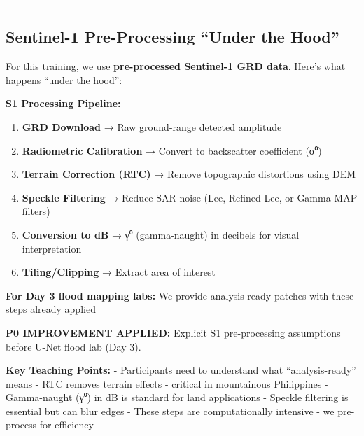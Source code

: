 \documentclass[
  letterpaper,
  DIV=11,
  numbers=noendperiod]{scrartcl}
\providecommand{\tightlist}{%
  \setlength{\itemsep}{0pt}\setlength{\parskip}{0pt}}
\begin{document}
\begin{center}\rule{0.5\linewidth}{0.5pt}\end{center}

\subsection{Sentinel-1 Pre-Processing ``Under the
Hood''}\label{sentinel-1-pre-processing-under-the-hood}

\begin{tcolorbox}[enhanced jigsaw, left=2mm, opacityback=0, toprule=.15mm, breakable, title=\textcolor{quarto-callout-note-color}{\faInfo}\hspace{0.5em}{What Happens Before You See SAR Data?}, colbacktitle=quarto-callout-note-color!10!white, arc=.35mm, titlerule=0mm, colback=white, bottomtitle=1mm, colframe=quarto-callout-note-color-frame, leftrule=.75mm, toptitle=1mm, rightrule=.15mm, bottomrule=.15mm, opacitybacktitle=0.6, coltitle=black]

For this training, we use \textbf{pre-processed Sentinel-1 GRD data}.
Here's what happens ``under the hood'':

\end{tcolorbox}

\textbf{S1 Processing Pipeline:}

\begin{enumerate}
\def\labelenumi{\arabic{enumi}.}
\tightlist
\item
  \textbf{GRD Download} → Raw ground-range detected amplitude
\item
  \textbf{Radiometric Calibration} → Convert to backscatter coefficient
  (σ⁰)
\item
  \textbf{Terrain Correction (RTC)} → Remove topographic distortions
  using DEM
\item
  \textbf{Speckle Filtering} → Reduce SAR noise (Lee, Refined Lee, or
  Gamma-MAP filters)
\item
  \textbf{Conversion to dB} → γ⁰ (gamma-naught) in decibels for visual
  interpretation
\item
  \textbf{Tiling/Clipping} → Extract area of interest
\end{enumerate}

\textbf{For Day 3 flood mapping labs:} We provide analysis-ready patches
with these steps already applied

\textbf{P0 IMPROVEMENT APPLIED:} Explicit S1 pre-processing assumptions
before U-Net flood lab (Day 3).

\textbf{Key Teaching Points:} - Participants need to understand what
``analysis-ready'' means - RTC removes terrain effects - critical in
mountainous Philippines - Gamma-naught (γ⁰) in dB is standard for land
applications - Speckle filtering is essential but can blur edges - These
steps are computationally intensive - we pre-process for efficiency
\end{document}
